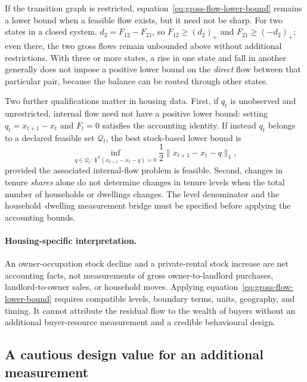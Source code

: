 If the transition graph is restricted, equation~\eqref{eq:gross-flow-lower-bound}
remains a lower bound when a feasible flow exists, but it need not be sharp.
For two states in a closed system,
\(d_2=F_{12}-F_{21}\), so
\(F_{12}\geq(d_2)_+\) and \(F_{21}\geq(-d_2)_+\); even there, the two gross
flows remain unbounded above without additional restrictions. With three or
more states, a rise in one state and fall in another generally does not impose
a positive lower bound on the \emph{direct} flow between that particular pair,
because the balance can be routed through other states.

Two further qualifications matter in housing data. First, if \(q_t\) is
unobserved and unrestricted, internal flow need not have a positive lower bound:
setting \(q_t=x_{t+1}-x_t\) and \(F_t=0\) satisfies the accounting identity.
If instead \(q_t\) belongs to a declared feasible set \(\mathcal Q_t\), the
best stock-based lower bound is
\begin{equation}
  \inf_{q\in\mathcal Q_t:\,\boldsymbol 1^{\mathsf T}
         (x_{t+1}-x_t-q)=0}
  \frac12\lVert x_{t+1}-x_t-q\rVert_1,
  \label{eq:external-flow-robust-bound}
\end{equation}
provided the associated internal-flow problem is feasible. Second, changes in
tenure \emph{shares} alone do not determine changes in tenure levels when the
total number of households or dwellings changes. The level denominator and
the household--dwelling measurement bridge must be specified before applying
the accounting bounds.

\paragraph{Housing-specific interpretation.}
An owner-occupation stock decline and a private-rental stock increase are net
accounting facts, not measurements of gross owner-to-landlord purchases,
landlord-to-owner sales, or household moves. Applying
equation~\eqref{eq:gross-flow-lower-bound} requires compatible levels, boundary
terms, units, geography, and timing. It cannot attribute the residual flow to
the wealth of buyers without an additional buyer-resource measurement and a
credible behavioural design.

\subsection{A cautious design value for an additional measurement}
\label{app:measurement-value}

